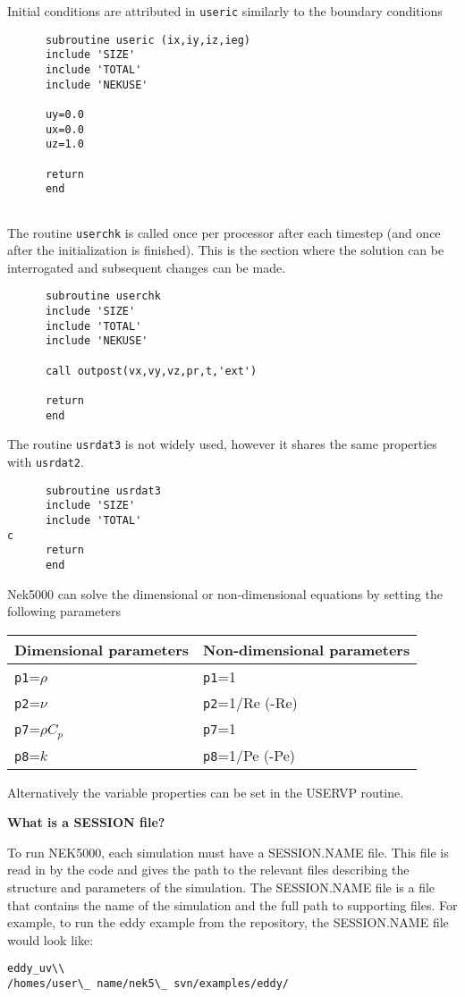 Initial conditions are attributed in {\tt useric} similarly to the boundary conditions
\begin{lstlisting}
      subroutine useric (ix,iy,iz,ieg)
      include 'SIZE'
      include 'TOTAL'
      include 'NEKUSE'
   
      uy=0.0
      ux=0.0
      uz=1.0

      return
      end
      
\end{lstlisting}
The routine {\tt userchk} is called once per processor after each timestep (and once after the initialization is finished). This is the section where the solution can be interrogated and subsequent changes can be made.
\begin{lstlisting}
      subroutine userchk
      include 'SIZE'
      include 'TOTAL'
      include 'NEKUSE'

      call outpost(vx,vy,vz,pr,t,'ext')
           
      return
      end
      \end{lstlisting}
      
The routine {\tt usrdat3} is not widely used, however it shares the same properties with {\tt usrdat2}.
\begin{lstlisting}
      subroutine usrdat3
      include 'SIZE'
      include 'TOTAL'
c
      return
      end
\end{lstlisting}

Nek5000 can solve the dimensional or non-dimensional equations by setting the following parameters

\begin{table}

\begin{tabular}{ l|l| }
   \hline
   Dimensional parameters & Non-dimensional parameters\\ \hline \hline
{\tt p1}=\(\rho\)      &      {\tt p1}=1\\
{\tt p2}=\(\nu\)       &      {\tt p2}=1/Re (-Re)\\
{\tt p7}=\(\rho C_p\)  &      {\tt p7}=1\\
{\tt p8}=\(k\)         &      {\tt p8}=1/Pe (-Pe)\\
   \hline
\end{tabular}
\end{table}

Alternatively the variable properties can be set in the USERVP routine.


\textbf{What is a SESSION file?}

To run NEK5000, each simulation must have a SESSION.NAME file. This file is read in by the code and gives the path to the relevant files describing the structure and parameters of the simulation. The SESSION.NAME file is a file that contains the name of the simulation and the full path to supporting files. For example, to run the eddy example from the repository, the SESSION.NAME file would look like:

\begin{verbatim}
eddy_uv\\
/homes/user\_ name/nek5\_ svn/examples/eddy/
\end{verbatim}

